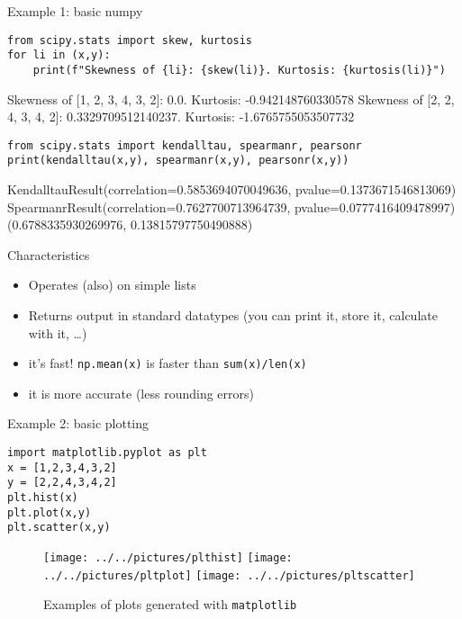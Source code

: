 \documentclass[compress]{beamer}
\begin{document}
\begin{frame}[fragile]{Example 1: basic numpy}
\begin{lstlisting}
from scipy.stats import skew, kurtosis
for li in (x,y):
    print(f"Skewness of {li}: {skew(li)}. Kurtosis: {kurtosis(li)}")
\end{lstlisting}
\begin{lstlistingoutput}
Skewness of [1, 2, 3, 4, 3, 2]: 0.0. Kurtosis: -0.942148760330578
Skewness of [2, 2, 4, 3, 4, 2]: 0.3329709512140237. Kurtosis: -1.6765755053507732
\end{lstlistingoutput}

\begin{lstlisting}
from scipy.stats import kendalltau, spearmanr, pearsonr
print(kendalltau(x,y), spearmanr(x,y), pearsonr(x,y))
\end{lstlisting}
\begin{lstlistingoutput}
KendalltauResult(correlation=0.5853694070049636, pvalue=0.1373671546813069) SpearmanrResult(correlation=0.7627700713964739, pvalue=0.0777416409478997) (0.6788335930269976, 0.13815797750490888)
\end{lstlistingoutput}

\end{frame}



\begin{frame}{Characteristics}
\begin{itemize}
	\item Operates (also) on simple lists
	\item Returns output in standard datatypes (you can print it, store it, calculate with it, \ldots)
	\item it's fast! \texttt{np.mean(x)} is faster than \texttt{sum(x)/len(x)}
	\item it is more accurate (less rounding errors) 
\end{itemize}
\end{frame}





\begin{frame}[fragile]{Example 2: basic plotting}
\begin{lstlisting}
import matplotlib.pyplot as plt
x = [1,2,3,4,3,2]
y = [2,2,4,3,4,2]
plt.hist(x)
plt.plot(x,y)
plt.scatter(x,y)
\end{lstlisting}


\begin{figure}[h]
	\centering
	\texttt{[image: ../../pictures/plthist]}\hfill
	\texttt{[image: ../../pictures/pltplot]}\hfill
	\texttt{[image: ../../pictures/pltscatter]}
	\caption{\label{fig:matplotlib}Examples of plots generated with \texttt{matplotlib}}
\end{figure}

\end{frame}
\end{document}
